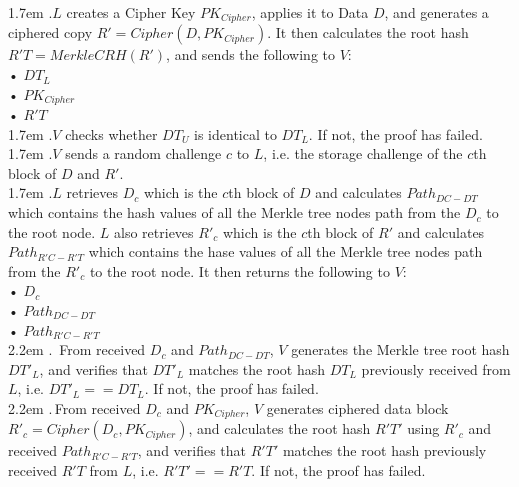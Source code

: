 \documentclass[10pt,a4paper]{article}
\begin{document}
\hangindent 1.7em
.\quad $L$ creates a Cipher Key $PK_{Cipher}$, applies it to Data $D$, and generates a ciphered copy $R'=Cipher(D, PK_{Cipher})$. It then calculates the root hash $R'T=MerkleCRH(R')$, and sends the following to $V$:
\\•  $DT_{L}$ \\ 
   •  $PK_{Cipher}$ \\ 
   •  $R'T$ 
   \vspace{-0.5em}
\\

\hangindent 1.7em
.\quad $V$ checks whether $DT_{U}$ is identical to $DT_{L}$. If not, the proof has failed.
\vspace{-0.8em}
\\

\hangindent 1.7em
.\quad $V$ sends a random challenge $c$ to $L$, i.e. the storage challenge of the $c$th block of $D$ and $R'$.
\vspace{-0.8em}
\\

\hangindent 1.7em
.\quad $L$ retrieves $D_{c}$ which is the $c$th block of $D$ and calculates $Path_{DC-DT}$ which contains the hash values of all the Merkle tree nodes path from the $D_{c}$ to the root node. $L$ also retrieves $R'_{c}$ which is the $c$th block of $R'$ and calculates $Path_{R'C-R'T}$ which contains the hase values of all the Merkle tree nodes path from the $R'_{c}$ to the root node. It then returns the following to $V$:
\\
    •  $D_{c}$\\
   •  $Path_{DC-DT}$\\
   •  $Path_{R'C-R'T}$
   \vspace{-0.5em}
\\

\hangindent 2.2em
.\quad \, From received $D_{c}$ and $Path_{DC-DT}$, $V$ generates the Merkle tree root hash $DT'_{L}$, and verifies that $DT'_{L}$ matches the root hash $DT_{L}$ previously received from $L$, i.e. $DT'_{L} == DT_{L}$. If not, the proof has failed.
\vspace{-0.8em}
\\

\hangindent 2.2em
.\quad\;\,From received $D_{c}$ and $PK_{Cipher}$, $V$ generates ciphered data block $R'_{c}=Cipher(D_{c}, PK_{Cipher})$, and calculates the root hash $R'T'$ using $R'_{c}$ and received $Path_{R'C-R'T}$, and verifies that $R'T'$ matches the root hash previously received $R'T$ from $L$, i.e. $R'T' == R'T$. If not, the proof has failed.
\vspace{-0.8em}
\\
\end{document}
